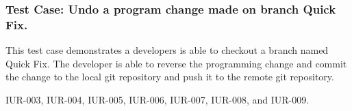 \subsubsection{Test Case: Undo a program change made on branch Quick Fix.}
\begin{description}[align=right,leftmargin=3.2cm,labelindent=3.0cm]
\item[Purpose:] This test case demonstrates a developers is able to checkout a branch named Quick Fix. The developer is able to reverse the programming change and commit the change to the local git repository and push it to the remote git repository.
\item[Requirement:] IUR-003, IUR-004, IUR-005, IUR-006, IUR-007, IUR-008, and IUR-009.
\end{description}
